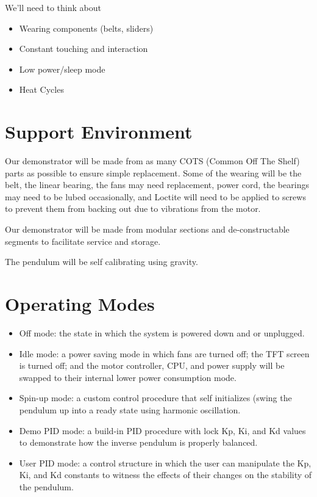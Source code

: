 \documentclass{article}
\begin{document}
    We'll need to think about

    \begin{itemize}
        \item Wearing components (belts, sliders)
        \item Constant touching and interaction
        \item Low power/sleep mode
        \item Heat Cycles
    \end{itemize}


\section{Support Environment}

Our demonstrator will be made from as many COTS (Common Off The Shelf) parts
as possible to ensure simple replacement.
Some of the wearing will be the belt, the linear bearing, the fans may need replacement, power cord, the bearings may need to be lubed occasionally, and Loctite will need to be applied to screws to prevent them from backing out due to vibrations from the motor.

Our demonstrator will be made from modular sections and de-constructable segments
to facilitate service and storage.

The pendulum will be self calibrating using gravity.



\section{Operating Modes}

    \begin{itemize}
        \item Off mode: the state in which the system is powered down and or unplugged.
        \item Idle mode: a power saving mode in which fans are turned off; the TFT screen is turned off; and the motor controller, CPU, and power supply will be swapped to their internal lower power consumption mode.
        \item Spin-up mode: a custom control procedure that self initializes (swing the pendulum up into a ready state using harmonic oscillation.
        \item Demo PID mode: a build-in PID procedure with lock Kp, Ki, and Kd values to demonstrate how the inverse pendulum is properly balanced.
        \item User PID mode: a control structure in which the user can manipulate the Kp, Ki, and Kd constants to witness the effects of their changes on the stability of the pendulum.
    \end{itemize}
\end{document}
